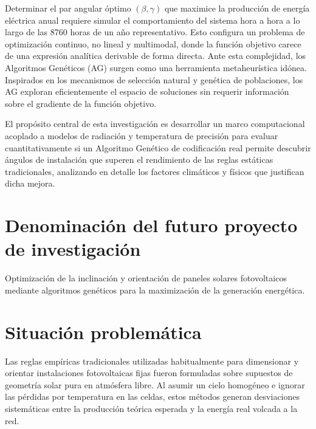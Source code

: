 \documentclass[12pt, a4paper, twocolumn]{article}
\begin{document}
Determinar el par angular óptimo $(\beta, \gamma)$ que maximice la producción de energía eléctrica anual requiere simular el comportamiento del sistema hora a hora a lo largo de las 8760 horas de un año representativo. Esto configura un problema de optimización continuo, no lineal y multimodal, donde la función objetivo carece de una expresión analítica derivable de forma directa. Ante esta complejidad, los Algoritmos Genéticos (AG) surgen como una herramienta metaheurística idónea. Inspirados en los mecanismos de selección natural y genética de poblaciones, los AG exploran eficientemente el espacio de soluciones sin requerir información sobre el gradiente de la función objetivo.

El propósito central de esta investigación es desarrollar un marco computacional acoplado a modelos de radiación y temperatura de precisión para evaluar cuantitativamente si un Algoritmo Genético de codificación real permite descubrir ángulos de instalación que superen el rendimiento de las reglas estáticas tradicionales, analizando en detalle los factores climáticos y físicos que justifican dicha mejora.

\section{Denominación del futuro proyecto de investigación}
Optimización de la inclinación y orientación de paneles solares fotovoltaicos mediante algoritmos genéticos para la maximización de la generación energética.

\section{Situación problemática}
Las reglas empíricas tradicionales utilizadas habitualmente para dimensionar y orientar instalaciones fotovoltaicas fijas fueron formuladas sobre supuestos de geometría solar pura en atmósfera libre. Al asumir un cielo homogéneo e ignorar las pérdidas por temperatura en las celdas, estos métodos generan desviaciones sistemáticas entre la producción teórica esperada y la energía real volcada a la red.
\end{document}
